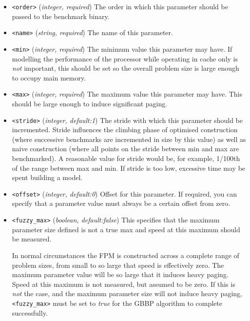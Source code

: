 \documentclass[a4paper,12pt]{report}
\begin{document}
    \begin{itemize}
        \item \verb+<order>+ (\emph{integer, required}) The order
            in which this parameter should be passed to the benchmark binary.
        \item \verb+<name>+ (\emph{string, required}) The name of this
            parameter.
        \item \verb+<min>+ (\emph{integer, required}) The
            minimum value this parameter may have. If modelling the performance
            of the processor while operating in cache only is \emph{not}
            important, this should be set so the overall problem size is large
            enough to occupy main memory.
        \item \verb+<max>+ (\emph{integer, required}) The maximum value this
            parameter may have. This should be large enough to induce
            significant paging.
        \item \verb+<stride>+ (\emph{integer, default:1}) The stride with which
            this parameter should be incremented. Stride influences the
            climbing phase of optimised construction (where successive
            benchmarks are incremented in size by this value) as well as naive
            construction (where all points on the stride between min and max
            are benchmarked). A reasonable value for stride would be, for
            example, 1/100th of the range between max and min. If stride is too
            low, excessive time may be spent building a model.
        \item \verb+<offset>+ (\emph{integer, default:0}) Offset for this
            parameter. If required, you can specify that a parameter value must
            always be a certain offset from zero.
        \item \verb+<fuzzy_max>+ (\emph{boolean, default:false}) This specifies
            that the maximum parameter size defined is not a true max and speed
            at this maximum should be measured.
            
            In normal circumstances the FPM is constructed across
            a complete range of problem sizes, from small to so large that
            speed is effectively zero. The maximum parameter value will be so
            large that it induces heavy paging. Speed at this maximum is not
            measured, but assumed to be zero. If this is \emph{not} the case,
            and the maximum parameter size will not induce heavy paging,
            \verb+<fuzzy_max>+ must be set to \emph{true} for the GBBP algorithm
            to complete successfully.
    \end{itemize}
\end{document}
